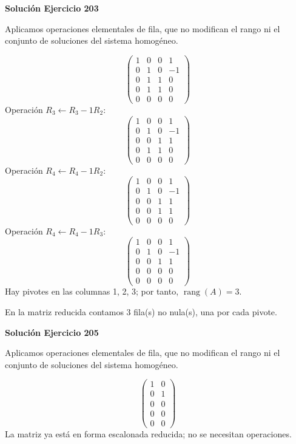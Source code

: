 \documentclass[12pt]{article}
\theoremstyle{remark}
\newcommand{\rang}{\operatorname{rang}}
\begin{document}
\par\bigskip\noindent\textbf{Solución Ejercicio 203}\par\nobreak
Aplicamos operaciones elementales de fila, que no modifican el rango ni el conjunto de soluciones del sistema homogéneo.

\[
\begin{pmatrix}1&0&0&1\\0&1&0&-1\\0&1&1&0\\0&1&1&0\\0&0&0&0\end{pmatrix}
\]
Operación $R_{3}\leftarrow R_{3}-1R_{2}$:
\[
\begin{pmatrix}1&0&0&1\\0&1&0&-1\\0&0&1&1\\0&1&1&0\\0&0&0&0\end{pmatrix}
\]
Operación $R_{4}\leftarrow R_{4}-1R_{2}$:
\[
\begin{pmatrix}1&0&0&1\\0&1&0&-1\\0&0&1&1\\0&0&1&1\\0&0&0&0\end{pmatrix}
\]
Operación $R_{4}\leftarrow R_{4}-1R_{3}$:
\[
\begin{pmatrix}1&0&0&1\\0&1&0&-1\\0&0&1&1\\0&0&0&0\\0&0&0&0\end{pmatrix}
\]
Hay pivotes en las columnas 1, 2, 3; por tanto, $\boxed{\rang(A)=3}$.

En la matriz reducida contamos 3 fila(s) no nula(s), una por cada pivote.


\par\bigskip\noindent\textbf{Solución Ejercicio 205}\par\nobreak
Aplicamos operaciones elementales de fila, que no modifican el rango ni el conjunto de soluciones del sistema homogéneo.

\[
\begin{pmatrix}1&0\\0&1\\0&0\\0&0\\0&0\end{pmatrix}
\]
La matriz ya está en forma escalonada reducida; no se necesitan operaciones.
\end{document}
